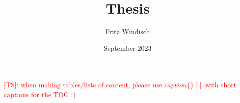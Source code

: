 \documentclass{book}
\title{Thesis}
\author{Fritz Windisch}
\date{September 2023}
\newcommand{\cts}[1]{\textcolor{red}{[TS]: #1}}
\begin{document}
\maketitle

\tableofcontents










\listoffigures
\cts{when making tables/lists of content, please use $caption\{\}[]$ with short captions for the TOC :)}
\listoftables

\printbibliography
\end{document}
